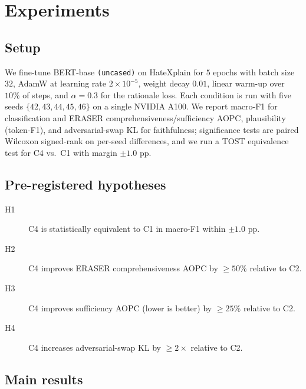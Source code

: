 \documentclass{article}
\begin{document}
\section{Experiments}
\label{sec:experiments}

\subsection{Setup}
We fine-tune BERT-base \texttt{(uncased)} on HateXplain for $5$ epochs with batch size
$32$, AdamW at learning rate $2\times 10^{-5}$, weight decay $0.01$, linear warm-up over
$10\%$ of steps, and $\alpha{=}0.3$ for the rationale loss. Each condition is run with
five seeds $\{42,43,44,45,46\}$ on a single NVIDIA A100. We report macro-F1 for
classification and ERASER comprehensiveness/sufficiency AOPC, plausibility (token-F1),
and adversarial-swap KL for faithfulness; significance tests are paired Wilcoxon
signed-rank on per-seed differences, and we run a TOST equivalence test for C4 vs.\ C1
with margin $\pm 1.0$ pp.

\subsection{Pre-registered hypotheses}
\begin{description}
\item[H1] C4 is statistically equivalent to C1 in macro-F1 within $\pm 1.0$ pp.
\item[H2] C4 improves ERASER comprehensiveness AOPC by $\geq 50\%$ relative to C2.
\item[H3] C4 improves sufficiency AOPC (lower is better) by $\geq 25\%$ relative to C2.
\item[H4] C4 increases adversarial-swap KL by $\geq 2{\times}$ relative to C2.
\end{description}

\subsection{Main results}
\end{document}
